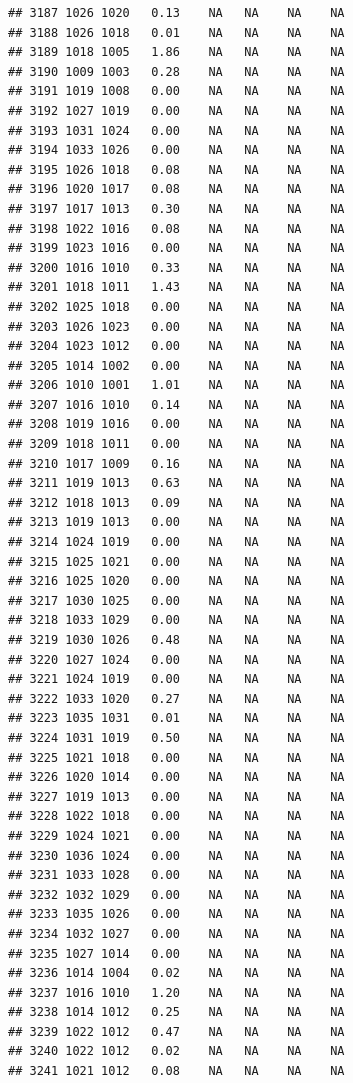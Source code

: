 \documentclass{article}\usepackage{graphicx, color}
\makeatletter
\newenvironment{kframe}{%
 \def\at@end@of@kframe{}%
 \ifinner\ifhmode%
  \def\at@end@of@kframe{\end{minipage}}%
  \begin{minipage}{\columnwidth}%
 \fi\fi%
 \def\FrameCommand##1{\hskip\@totalleftmargin \hskip-\fboxsep
 \colorbox{shadecolor}{##1}\hskip-\fboxsep
     \hskip-\linewidth \hskip-\@totalleftmargin \hskip\columnwidth}%
 \MakeFramed {\advance\hsize-\width
   \@totalleftmargin\z@ \linewidth\hsize
   \@setminipage}}%
 {\par\unskip\endMakeFramed%
 \at@end@of@kframe}
\newenvironment{knitrout}{}{} %
\makeatother
\begin{document}
\begin{knitrout}
\begin{kframe}
\begin{verbatim}
## 3187 1026 1020   0.13    NA   NA    NA    NA
## 3188 1026 1018   0.01    NA   NA    NA    NA
## 3189 1018 1005   1.86    NA   NA    NA    NA
## 3190 1009 1003   0.28    NA   NA    NA    NA
## 3191 1019 1008   0.00    NA   NA    NA    NA
## 3192 1027 1019   0.00    NA   NA    NA    NA
## 3193 1031 1024   0.00    NA   NA    NA    NA
## 3194 1033 1026   0.00    NA   NA    NA    NA
## 3195 1026 1018   0.08    NA   NA    NA    NA
## 3196 1020 1017   0.08    NA   NA    NA    NA
## 3197 1017 1013   0.30    NA   NA    NA    NA
## 3198 1022 1016   0.08    NA   NA    NA    NA
## 3199 1023 1016   0.00    NA   NA    NA    NA
## 3200 1016 1010   0.33    NA   NA    NA    NA
## 3201 1018 1011   1.43    NA   NA    NA    NA
## 3202 1025 1018   0.00    NA   NA    NA    NA
## 3203 1026 1023   0.00    NA   NA    NA    NA
## 3204 1023 1012   0.00    NA   NA    NA    NA
## 3205 1014 1002   0.00    NA   NA    NA    NA
## 3206 1010 1001   1.01    NA   NA    NA    NA
## 3207 1016 1010   0.14    NA   NA    NA    NA
## 3208 1019 1016   0.00    NA   NA    NA    NA
## 3209 1018 1011   0.00    NA   NA    NA    NA
## 3210 1017 1009   0.16    NA   NA    NA    NA
## 3211 1019 1013   0.63    NA   NA    NA    NA
## 3212 1018 1013   0.09    NA   NA    NA    NA
## 3213 1019 1013   0.00    NA   NA    NA    NA
## 3214 1024 1019   0.00    NA   NA    NA    NA
## 3215 1025 1021   0.00    NA   NA    NA    NA
## 3216 1025 1020   0.00    NA   NA    NA    NA
## 3217 1030 1025   0.00    NA   NA    NA    NA
## 3218 1033 1029   0.00    NA   NA    NA    NA
## 3219 1030 1026   0.48    NA   NA    NA    NA
## 3220 1027 1024   0.00    NA   NA    NA    NA
## 3221 1024 1019   0.00    NA   NA    NA    NA
## 3222 1033 1020   0.27    NA   NA    NA    NA
## 3223 1035 1031   0.01    NA   NA    NA    NA
## 3224 1031 1019   0.50    NA   NA    NA    NA
## 3225 1021 1018   0.00    NA   NA    NA    NA
## 3226 1020 1014   0.00    NA   NA    NA    NA
## 3227 1019 1013   0.00    NA   NA    NA    NA
## 3228 1022 1018   0.00    NA   NA    NA    NA
## 3229 1024 1021   0.00    NA   NA    NA    NA
## 3230 1036 1024   0.00    NA   NA    NA    NA
## 3231 1033 1028   0.00    NA   NA    NA    NA
## 3232 1032 1029   0.00    NA   NA    NA    NA
## 3233 1035 1026   0.00    NA   NA    NA    NA
## 3234 1032 1027   0.00    NA   NA    NA    NA
## 3235 1027 1014   0.00    NA   NA    NA    NA
## 3236 1014 1004   0.02    NA   NA    NA    NA
## 3237 1016 1010   1.20    NA   NA    NA    NA
## 3238 1014 1012   0.25    NA   NA    NA    NA
## 3239 1022 1012   0.47    NA   NA    NA    NA
## 3240 1022 1012   0.02    NA   NA    NA    NA
## 3241 1021 1012   0.08    NA   NA    NA    NA

\end{verbatim}
\end{kframe}
\end{knitrout}
\end{document}
